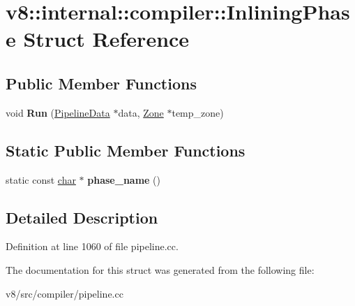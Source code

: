 \hypertarget{structv8_1_1internal_1_1compiler_1_1InliningPhase}{}\section{v8\+:\+:internal\+:\+:compiler\+:\+:Inlining\+Phase Struct Reference}
\label{structv8_1_1internal_1_1compiler_1_1InliningPhase}
\subsection*{Public Member Functions}
\begin{DoxyCompactItemize}
\item 
\mbox{\label{structv8_1_1internal_1_1compiler_1_1InliningPhase_a4d3f51affb8b7a1578ae40efbdabc578}} 
void {\bfseries Run} (\mbox{\hyperlink{classv8_1_1internal_1_1compiler_1_1PipelineData}{Pipeline\+Data}} $\ast$data, \mbox{\hyperlink{classv8_1_1internal_1_1Zone}{Zone}} $\ast$temp\+\_\+zone)
\end{DoxyCompactItemize}
\subsection*{Static Public Member Functions}
\begin{DoxyCompactItemize}
\item 
\mbox{\label{structv8_1_1internal_1_1compiler_1_1InliningPhase_a3c0aa77760e05608df474499a1fb43f2}} 
static const \mbox{\hyperlink{classchar}{char}} $\ast$ {\bfseries phase\+\_\+name} ()
\end{DoxyCompactItemize}


\subsection{Detailed Description}


Definition at line 1060 of file pipeline.\+cc.



The documentation for this struct was generated from the following file\+:\begin{DoxyCompactItemize}
\item 
v8/src/compiler/pipeline.\+cc\end{DoxyCompactItemize}

